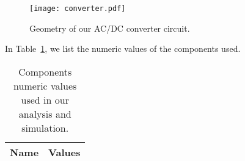 \begin{figure}[h] \centering
\texttt{[image: converter.pdf]}
\caption{Geometry of our AC/DC converter circuit.}
\end{figure}

In Table~\ref{tab:data}, we list the numeric values of the components used.

\begin{table}[h]
  \centering
  \begin{tabular}{|l|r|}
    \hline    
    {\bf Name} & {\bf Values} \\ \hline
     
  \end{tabular}
  \caption{Components numeric values used in our analysis and simulation.}
  \label{tab:data}
\end{table}
